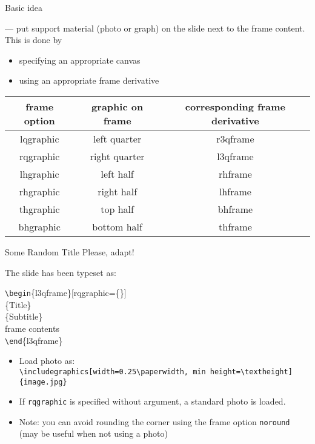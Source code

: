 \documentclass[aspectratio=1610]{beamer}
\newcommand*\command[1]{{\tt \textbackslash #1}}
\newcommand*\ind[1][2ex]{\hspace*{#1}}
\newcommand*\bframe[1][]{\command{begin}\{#1frame\}}
\newcommand*\eframe[1][]{\command{end}\{#1frame\}}
\begin{document}
\begin{frame}[t]
  {Basic idea}

   --- put support material (photo or graph) on the
  slide next to the frame content.
  This is done by
  \begin{itemize}
  \item specifying an appropriate canvas
  \item using an appropriate frame derivative
  \end{itemize}

  \begin{center}\small
    \begin{tabular}{ccc}
      \toprule
      \bfseries frame option & \bfseries graphic on frame
      & \bfseries corresponding frame derivative\\
      \midrule
      lqgraphic & left quarter   & r3qframe \\
      rqgraphic & right quarter & l3qframe \\
      lhgraphic & left half      & rhframe \\
      rhgraphic & right half    & lhframe \\
      thgraphic & top half       & bhframe \\
      bhgraphic & bottom half   & thframe\\
      \bottomrule
    \end{tabular}
  \end{center}

\end{frame}

\begin{l3qframe}[rqgraphic]
  {Some Random Title}
  {Please, adapt!}

  \small
  The slide has been typeset as:\\
  \begin{codesnippet}[\textwidth]
    \bframe[l3q][rqgraphic=\{<load photo here>\}]\\
    \ind\{Title\}\\
    \ind\{Subtitle\}\\
    \ind frame contents\\
    \eframe[l3q]
  \end{codesnippet}
  \smallskip

  \begin{itemize}
  \item Load photo as:\\
    \command{includegraphics[width=0.25\command{paperwidth}, min height=\command{textheight}]
      \{image.jpg\}}
  \item If \texttt{rqgraphic} is specified without argument, a standard photo
    is loaded.
  \item Note: you can avoid rounding the corner using the
    frame option \texttt{noround} (may be useful when not using a photo)
  \end{itemize}
\end{l3qframe}
\end{document}
